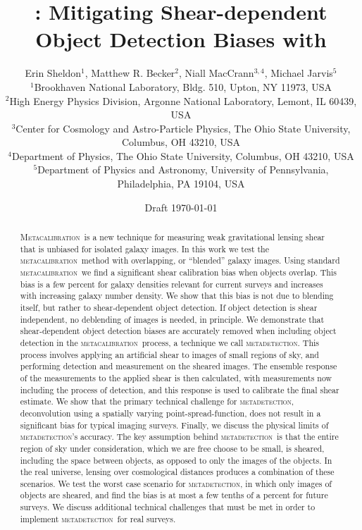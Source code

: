 \documentclass[fleqn,useAMS,usenatbib]{mnras}
\title[\Mdet]{\Mdet: Mitigating Shear-dependent Object Detection Biases with \Mcal}
\author[Sheldon et~al.]{Erin Sheldon$^1$, Matthew R. Becker$^2$,
Niall MacCrann$^{3,4}$, Michael Jarvis$^5$
  \\$^1$Brookhaven National Laboratory, Bldg. 510, Upton, NY 11973, USA
  \\$^2$High Energy Physics Division, Argonne National Laboratory, Lemont, IL 60439, USA
  \\$^3$Center for Cosmology and Astro-Particle Physics, The Ohio State University, Columbus, OH 43210, USA
  \\$^4$Department of Physics, The Ohio State University, Columbus, OH 43210, USA
  \\$^5$Department of Physics and Astronomy, University of Pennsylvania, Philadelphia, PA 19104, USA
}
\newcommand{\mcal}{\textsc{metacalibration}}
\newcommand{\mdet}{\textsc{metadetection}}
\newcommand{\Mcal}{\textsc{Metacalibration}}
\begin{document}
\date{Draft \today}
\maketitle

\begin{abstract}

    \Mcal\ is a new technique for measuring weak gravitational lensing shear
    that is unbiased for isolated galaxy images.  In this work we test the
    \mcal\ method with overlapping, or ``blended'' galaxy images.  Using
    standard \mcal\ we find a significant shear calibration bias when objects
    overlap.  This bias is a few percent for galaxy densities relevant for
    current surveys and increases with increasing galaxy number density.  We
    show that this bias is not due to blending itself, but rather to
    shear-dependent object detection.   If object detection is shear
    independent, no deblending of images is needed, in principle.  We
    demonstrate that shear-dependent object detection biases are accurately
    removed when including object detection in the \mcal\ process, a technique
    we call \mdet. This process involves applying an artificial shear to images
    of small regions of sky, and performing detection and measurement on the
    sheared images. The ensemble response of the measurements to the applied
    shear is then calculated, with measurements now including the process of
    detection, and this response is used to calibrate the final shear estimate.
    We show that the primary technical challenge for \mdet, deconvolution using
    a spatially varying point-spread-function, does not result in a significant
    bias for typical imaging surveys.  Finally, we discuss the physical limits
    of \mdet's accuracy.  The key assumption behind \mdet\ is that the entire
    region of sky under consideration, which we are free choose to be small, is
    sheared, including the space between objects, as opposed to only the images
    of the objects.  In the real universe, lensing over cosmological distances
    produces a combination of these scenarios.  We test the worst case scenario
    for \mdet, in which only images of objects are sheared, and find the bias
    is at most a few tenths of a percent for future surveys.  We discuss
    additional technical challenges that must be met in order to implement
    \mdet\ for real surveys.
    
    

\end{abstract}
\end{document}
